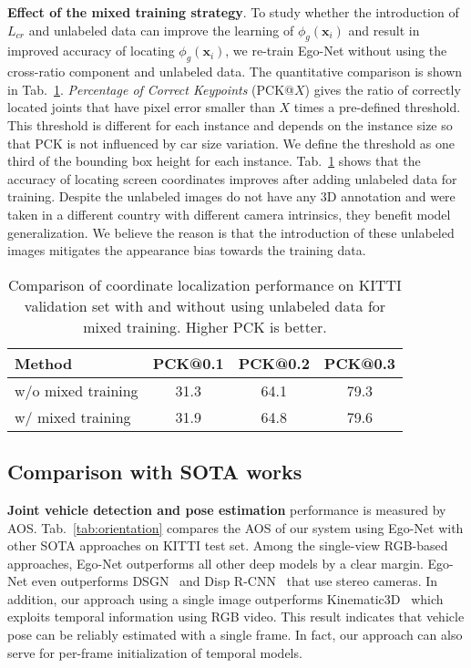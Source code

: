 \documentclass[final]{cvpr}
\begin{document}
\noindent \textbf{Effect of the mixed training strategy}. To study whether the introduction of $L_{cr}$ and unlabeled data can improve the learning of $\phi_g(\mathbf{x}_i)$ and result in improved accuracy of locating $\phi_g(\mathbf{x}_i)$, we re-train Ego-Net without using the cross-ratio component and unlabeled data. The quantitative comparison is shown in Tab.~\ref{tab:cru}. \emph{Percentage of Correct Keypoints} (PCK@$X$) gives the ratio of correctly located joints that have pixel error smaller than $X$ times a pre-defined threshold. This threshold is different for each instance and depends on the instance size so that PCK is not influenced by car size variation. We define the threshold as one third of the bounding box height for each instance. Tab.~\ref{tab:cru} shows that the accuracy of locating screen coordinates improves after adding unlabeled data for training. Despite the unlabeled images do not have any 3D annotation and were taken in a different country with different camera intrinsics, they benefit model generalization. We believe the reason is that the introduction of these unlabeled images mitigates the appearance bias towards the training data. 

\begin{table}[h]
	\footnotesize
	\centering
	\begin{tabular}{|l|c|c|c|}
		\hline
		Method &  PCK@0.1 & PCK@0.2 & PCK@0.3 \\
		\hline
		\rowcolor{grayDark}
		w/o mixed training  & 31.3  &64.1 &79.3 \\
		\rowcolor{grayLight}
		w/ mixed training& 31.9  &64.8 & 79.6\\	
		\hline	
	\end{tabular}
	\caption{Comparison of coordinate localization performance on KITTI validation set with and without using unlabeled data for mixed training. Higher PCK is better.}
	\label{tab:cru}
\end{table} 
	
\subsection{Comparison with SOTA works} 
\noindent \textbf{Joint vehicle detection and pose estimation} performance is measured by AOS. Tab.~\ref{tab:orientation} compares the AOS of our system using Ego-Net with other SOTA approaches on KITTI test set. Among the single-view RGB-based approaches, Ego-Net outperforms all other deep models by a clear margin. Ego-Net even outperforms DSGN~\cite{chen2020dsgn} and Disp R-CNN~\cite{sun2020disp} that use stereo cameras. In addition, our approach using a single image outperforms Kinematic3D~\cite{kinematic-3d} which exploits temporal information using RGB video. This result indicates that vehicle pose can be reliably estimated with a single frame. In fact, our approach can also serve for per-frame initialization of temporal models.
\end{document}
